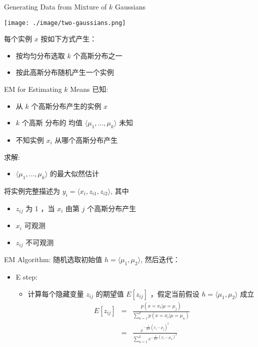 \documentclass[presentation]{beamer}
\begin{document}
\begin{frame}[label={sec:orgf55dc9a}]{Generating Data from Mixture of \(k\) Gaussians}
\begin{center}
\texttt{[image: ./image/two-gaussians.png]}
\end{center}


每个实例 \(x\) 按如下方式产生：
\begin{itemize}
\item 按均匀分布选取 \(k\) 个高斯分布之一
\item 按此高斯分布随机产生一个实例
\end{itemize}
\end{frame}

\begin{frame}[label={sec:org21e6870}]{EM for Estimating \(k\) Means}
已知:
\begin{itemize}
\item 从 \(k\) 个高斯分布产生的实例 \(x\)
\item \(k\) 个高斯 分布的 均值 \(\langle \mu_1, \ldots, \mu_k \rangle\) 未知
\item 不知实例 \(x_i\) 从哪个高斯分布产生
\end{itemize}

求解:
\begin{itemize}
\item \(\langle \mu_1, \ldots, \mu_k \rangle\) 的最大似然估计
\end{itemize}

将实例完整描述为 \(y_i = \langle x_i, z_{i1}, z_{i2}\rangle\), 其中
\begin{itemize}
\item \(z_{ij}\) 为 1 ，当 \(x_i\) 由第 \(j\) 个高斯分布产生
\item \(x_i\) 可观测
\item \(z_{ij}\) 不可观测
\end{itemize}
\end{frame}


\begin{frame}[label={sec:orgaed5103}]{EM Algorithm:}
随机选取初始值 \(h = \langle \mu_1, \mu_2 \rangle\), 然后迭代：
\begin{itemize}
\item E step:
\begin{itemize}
\item 计算每个隐藏变量 \(z_{ij}\) 的期望值 \(E[z_{ij}]\) ，假定当前假设 \(h = \langle \mu_1, \mu_2 \rangle\) 成立
\begin{eqnarray}
 E[z_{ij}] & = & \frac{p(x=x_i | \mu = \mu_j)}{\sum_{n=1}^{2} p(x = x_i | \mu=\mu_n)} \nonumber \\
 & = & \frac{e^{-\frac{1}{2 \sigma^2} (x_i -  \mu_j)^2}}{\sum_{n=1}^{2} e^{-\frac{1}{2 \sigma^2} (x_i - \mu_n)^2}} \nonumber
\end{eqnarray}
\end{itemize}
\end{itemize}
\end{frame}
\end{document}
